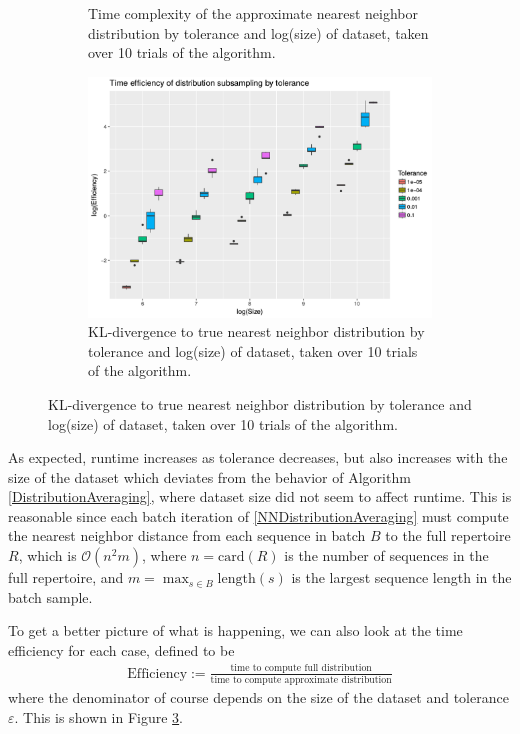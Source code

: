 \documentclass{article}
\begin{document}
\begin{figure}
\begin{subfigure}{0.5\textwidth}
    	\caption{Time complexity of the approximate nearest neighbor distribution by tolerance and log(size) of dataset, taken over 10 trials of the algorithm.}
    	\label{fig:TimeBySize}
    \end{subfigure}
    \begin{subfigure}{0.5\textwidth}
        \includegraphics[width=\linewidth]{Figures/NearestNeighbor/efficiency_by_size_and_tol_cdr3.png}
    	\caption{KL-divergence to true nearest neighbor distribution by tolerance and log(size) of dataset, taken over 10 trials of the algorithm.}
    	\label{fig:EfficiencyBySize}
    \end{subfigure}
\end{figure}
As expected, runtime increases as tolerance decreases, but also increases with the size of the dataset which deviates from the behavior of Algorithm \ref{DistributionAveraging}, where dataset size did not seem to affect runtime.
This is reasonable since each batch iteration of \ref{NNDistributionAveraging} must compute the nearest neighbor distance from each sequence in batch $B$ to the full repertoire $R$, which is $\mathcal O(n^2 m)$, where $n = \text{card}(R)$ is the number of sequences in the full repertoire, and $m = \max_{s \in B} \text{length}(s)$ is the largest sequence length in the batch sample.

To get a better picture of what is happening, we can also look at the time efficiency for each case, defined to be 
\begin{align}
    \text{Efficiency} := \frac{\text{time to compute full distribution}}{\text{time to compute approximate distribution}}
\end{align}
where the denominator of course depends on the size of the dataset and tolerance $\varepsilon$.
This is shown in Figure \ref{fig:EfficiencyBySize}.
\end{document}
